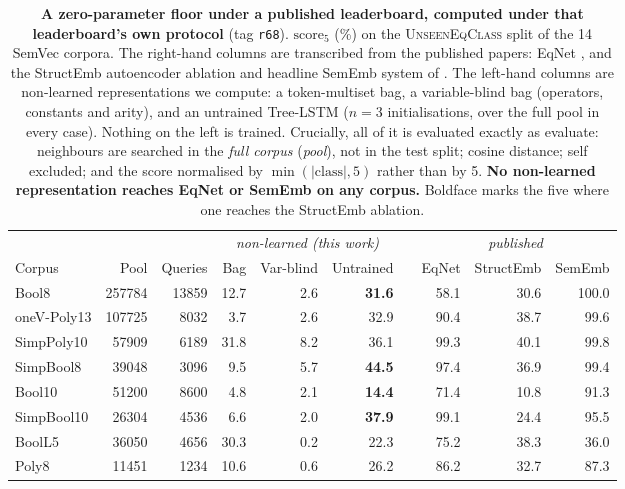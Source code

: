 \begin{table}[t]
\centering
\caption{\textbf{A zero-parameter floor under a published leaderboard, computed under that leaderboard's own protocol} (tag \texttt{r68}). $\mathrm{score}_5$ (\%) on the \textsc{UnseenEqClass} split of the 14 SemVec corpora. The right-hand columns are transcribed from the published papers: EqNet \citep{allamanis2017learning}, and the StructEmb autoencoder ablation and headline SemEmb system of \citet{gangwar2023semantic}. The left-hand columns are non-learned representations we compute: a token-multiset bag, a variable-blind bag (operators, constants and arity), and an untrained Tree-LSTM ($n{=}3$ initialisations, over the full pool in every case). Nothing on the left is trained. Crucially, all of it is evaluated exactly as \citet{allamanis2017learning} evaluate: neighbours are searched in the \emph{full corpus} (\emph{pool}), not in the test split; cosine distance; self excluded; and the score normalised by $\min(|\text{class}|, 5)$ rather than by 5. \textbf{No non-learned representation reaches EqNet or SemEmb on any corpus.} Boldface marks the five where one reaches the StructEmb ablation.}
\label{tab:score5}
\small
\setlength{\tabcolsep}{3.5pt}
\begin{tabular}{l r r rrr r rrr}
\toprule
& & & \multicolumn{3}{c}{\emph{non-learned (this work)}} & & \multicolumn{3}{c}{\emph{published}} \\
\cmidrule(lr){4-6} \cmidrule(lr){8-10}
Corpus & Pool & Queries & Bag & Var-blind & Untrained & & EqNet & StructEmb & SemEmb \\
\midrule
Bool8        & 257784 & 13859 & 12.7 &  2.6 & \textbf{31.6} & & 58.1 & 30.6 & 100.0 \\
oneV-Poly13  & 107725 &  8032 &  3.7 &  2.6 & 32.9 & & 90.4 & 38.7 &  99.6 \\
SimpPoly10   &  57909 &  6189 & 31.8 &  8.2 & 36.1 & & 99.3 & 40.1 &  99.8 \\
SimpBool8    &  39048 &  3096 &  9.5 &  5.7 & \textbf{44.5} & & 97.4 & 36.9 &  99.4 \\
Bool10       &  51200 &  8600 &  4.8 &  2.1 & \textbf{14.4} & & 71.4 & 10.8 &  91.3 \\
SimpBool10   &  26304 &  4536 &  6.6 &  2.0 & \textbf{37.9} & & 99.1 & 24.4 &  95.5 \\
BoolL5       &  36050 &  4656 & 30.3 &  0.2 & 22.3 & & 75.2 & 38.3 &  36.0 \\
Poly8        &  11451 &  1234 & 10.6 &  0.6 & 26.2 & & 86.2 & 32.7 &  87.3 \\

\end{tabular}
\end{table}
